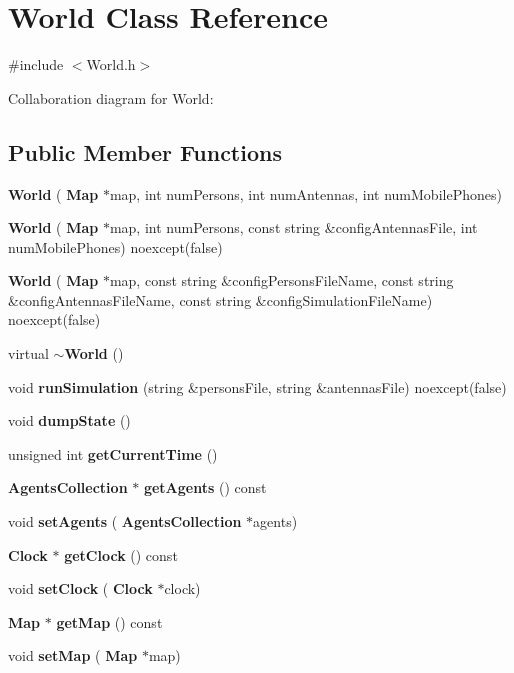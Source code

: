 \section{World Class Reference}
\label{class_world}


{\ttfamily \#include $<$World.\+h$>$}



Collaboration diagram for World\+:
\subsection*{Public Member Functions}
\begin{DoxyCompactItemize}
\item 
\textbf{ World} (\textbf{ Map} $\ast$map, int num\+Persons, int num\+Antennas, int num\+Mobile\+Phones)
\item 
\textbf{ World} (\textbf{ Map} $\ast$map, int num\+Persons, const string \&config\+Antennas\+File, int num\+Mobile\+Phones) noexcept(false)
\item 
\textbf{ World} (\textbf{ Map} $\ast$map, const string \&config\+Persons\+File\+Name, const string \&config\+Antennas\+File\+Name, const string \&config\+Simulation\+File\+Name) noexcept(false)
\item 
virtual \textbf{ $\sim$\+World} ()
\item 
void \textbf{ run\+Simulation} (string \&persons\+File, string \&antennas\+File) noexcept(false)
\item 
void \textbf{ dump\+State} ()
\item 
unsigned int \textbf{ get\+Current\+Time} ()
\item 
\textbf{ Agents\+Collection} $\ast$ \textbf{ get\+Agents} () const
\item 
void \textbf{ set\+Agents} (\textbf{ Agents\+Collection} $\ast$agents)
\item 
\textbf{ Clock} $\ast$ \textbf{ get\+Clock} () const
\item 
void \textbf{ set\+Clock} (\textbf{ Clock} $\ast$clock)
\item 
\textbf{ Map} $\ast$ \textbf{ get\+Map} () const
\item 
void \textbf{ set\+Map} (\textbf{ Map} $\ast$map)
\end{DoxyCompactItemize}
